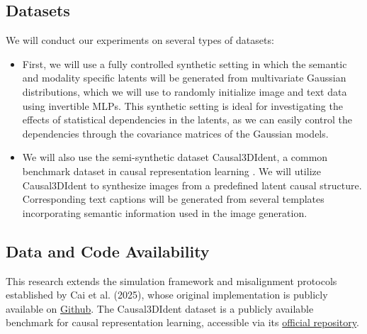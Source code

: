 \documentclass[a4paper,12pt]{article}
\begin{document}
\subsection*{Datasets}

We will conduct our experiments on several types of datasets:
\begin{itemize}
  \item First, we will use a fully controlled synthetic setting in which the semantic and modality specific latents will be generated from multivariate Gaussian distributions, which we will use to randomly initialize image and text data using invertible MLPs. This synthetic setting is ideal for investigating the effects of statistical dependencies in the latents, as we can easily control the dependencies through the covariance matrices of the Gaussian models.
  \item We will also use the semi-synthetic dataset Causal3DIdent, a common benchmark dataset in causal representation learning \cite{julius_von_kugelgen_2021_4784282}. We will utilize Causal3DIdent to synthesize images from a predefined latent causal structure. Corresponding text captions will be generated from several templates incorporating semantic information used in the image generation.
\end{itemize}

\subsection*{Data and Code Availability}
This research extends the simulation framework and misalignment protocols established by Cai et al. (2025), whose original implementation is publicly available on \href{https://github.com/YichaoCai1/crossmodal_misalignment/tree/main}{Github}. The Causal3DIdent dataset is a publicly available benchmark for causal representation learning, accessible via its \href{https://zenodo.org/records/4784282#.YgWo0PXMKbg}{official repository}.

\newpage


\end{document}
